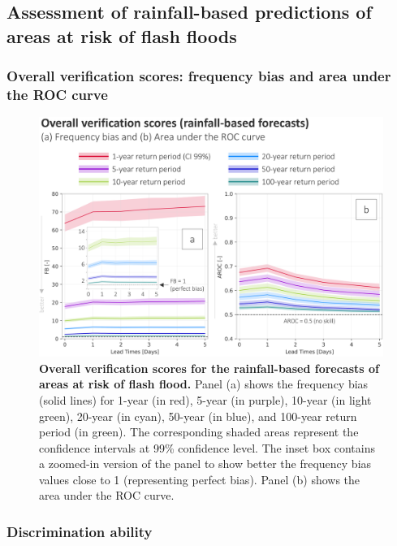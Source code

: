 \subsection{Assessment of rainfall-based predictions of areas at risk of flash floods}
\label{verif_rainfall_based_fc}

\subsubsection{Overall verification scores: frequency bias and area under the ROC curve}

\begin{figure}[htbp]
\centering
\includegraphics[width=\textwidth]{chapter_05/figures/rainfall_based_ff_verif_overall_scores.png}
\caption{\textbf{Overall verification scores for the rainfall-based forecasts of areas at risk of flash flood.} Panel (a) shows the frequency bias (solid lines) for 1-year (in red), 5-year (in purple), 10-year (in light green), 20-year (in cyan), 50-year (in blue), and 100-year return period (in green). The corresponding shaded areas represent the confidence intervals at 99\% confidence level. The inset box contains a zoomed-in version of the panel to show better the frequency bias values close to 1 (representing perfect bias). Panel (b) shows the area under the ROC curve.}
\label{fig:rainfall_based_ff_verif_overall_scores}
\end{figure}


\subsubsection{Discrimination ability}

